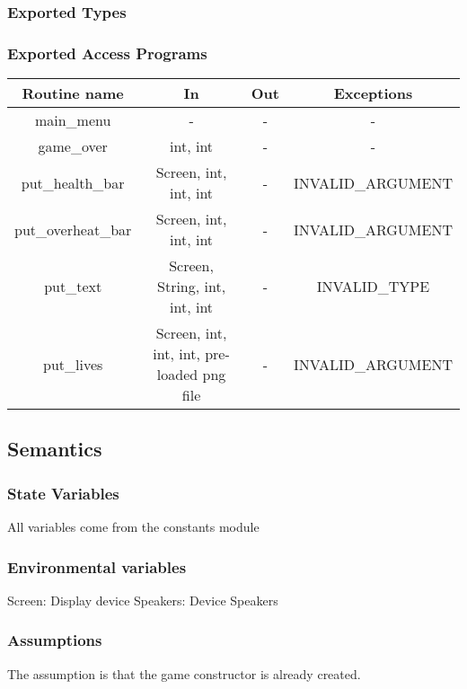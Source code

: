 \documentclass[12pt, titlepage]{article}
\begin{document}
\subsubsection {Exported Types}

\subsubsection {Exported Access Programs}

\begin{tabular}{| c | c | c | c |}
\hline
\textbf{Routine name} & \textbf{In} & \textbf{Out} & \textbf{Exceptions}\\
\hline
main\_menu & -  & - & -\\
\hline
game\_over & int, int & - & -\\
\hline
put\_health\_bar & Screen, int, int, int & - & INVALID\_ARGUMENT\\
\hline
put\_overheat\_bar & Screen, int, int, int & - & INVALID\_ARGUMENT\\
\hline
put\_text & Screen, String, int, int, int & - & INVALID\_TYPE\\
\hline
put\_lives & Screen, int, int, int, pre-loaded png file & - & INVALID\_ARGUMENT\\
\hline

\end{tabular}
\subsection {Semantics}

\subsubsection {State Variables}
All variables come from the constants module

\subsubsection {Environmental variables}
Screen: Display device
Speakers: Device Speakers

\subsubsection {Assumptions}
The assumption is that the game constructor is already created.
\end{document}
